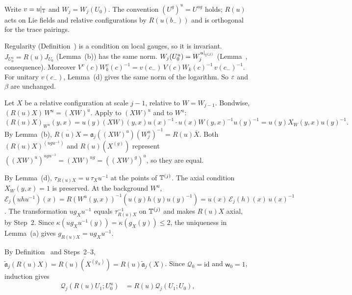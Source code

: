\begin{detail}\label{d11a:A2}
Write $v=u|_\mathbb T$ and $W_j=W_j(U_0)$. The convention $(U^g)^u=U^{ug}$ holds; $R(u)$ acts on Lie fields and relative configurations by $R(u(b_-))$ and is orthogonal for the trace pairings.
\begin{step}
Regularity (Definition~) is a condition on local gauges, so it is invariant. $J_{U_0^u}=R(u)J_{U_0}$ (Lemma~(b)) has the same norm. $W_j(U_0^u)=W_j^{u|_{\mathbb T^{(j)}}}$ (Lemma~, consequence). Moreover $V^v(c)W_k^v(c)^{-1}=v(c_-)\,V(c)W_k(c)^{-1}\,v(c_-)^{-1}$. For unitary $v(c_-)$, Lemma~(d) gives the same norm of the logarithm. So $\varepsilon$ and $\beta$ are unchanged.
\end{step}
\begin{step}
Let $X$ be a relative configuration at scale $j-1$, relative to $W=W_{j-1}$. Bondwise, $(R(u)X)\,W^u=(XW)^u$. Apply  to $(XW)^u$ and to $W^u$:
\[
(R(u)X)_{W^u}(y,x)=u(y)(XW)(y,x)u(x)^{-1}\cdot u(x)W(y,x)^{-1}u(y)^{-1}=u(y)X_W(y,x)u(y)^{-1}.
\]
By Lemma~(b), $\overline{R(u)X}=\mathfrak a_j((XW)^u)(W_j^u)^{-1}=R(u)\overline X$. Both $(R(u)X)^{(ugu^{-1})}$ and $R(u)(X^{(g)})$ represent $((XW)^u)^{ugu^{-1}}=(XW)^{ug}=((XW)^g)^u$, so they are equal.
\end{step}
\begin{step}
By Lemma~(d), $\tau_{R(u)X}=u\,\tau_Xu^{-1}$ at the points of $\mathbb T^{(j)}$. The axial condition $X_W(y,x)=1$ is preserved. At the background $W^u$, $\mathcal E_j(uhu^{-1})(x)=R(W^u(y,x))^{-1}(u(y)h(y)u(y)^{-1})=u(x)\,\mathcal E_j(h)(x)\,u(x)^{-1}$. The transformation $ug_Xu^{-1}$ equals $\tau_{R(u)X}^{-1}$ on $\mathbb T^{(j)}$ and makes $R(u)X$ axial, by Step~2. Since $\kappa(ug_Xu^{-1}(y))=\kappa(g_X(y))\le2$, the uniqueness in Lemma~(a) gives $g_{R(u)X}=ug_Xu^{-1}$.
\end{step}
\begin{step}
By Definition~ and Steps~2--3, $\tilde{\mathfrak a}_j(R(u)X)=\overline{R(u)(X^{(g_X)})}=R(u)\tilde{\mathfrak a}_j(X)$. Since $\mathcal Q_0=\mathrm{id}$ and $\mathsf w_0=1$, induction gives
\[
\begin{aligned}
\mathcal Q_j(R(u)U_1;U_0^u)&=R(u)\mathcal Q_j(U_1;U_0),\\

\end{aligned}\]
\end{step}
\end{detail}
